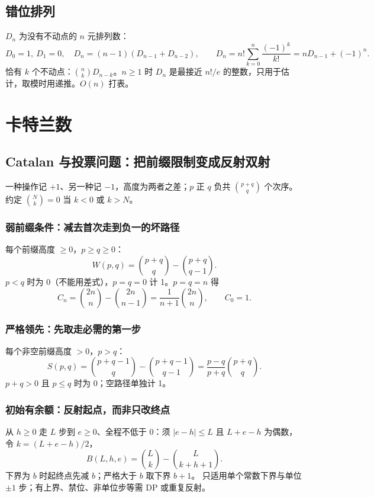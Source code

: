 \subsection{错位排列}\label{knowledge-derangement}
$D_n$ 为没有不动点的 $n$ 元排列数：
\[
D_0=1,\ D_1=0,\quad D_n=(n-1)(D_{n-1}+D_{n-2}),\qquad D_n=n!\sum_{k=0}^{n}\frac{(-1)^k}{k!}=nD_{n-1}+(-1)^n.
\]
恰有 $k$ 个不动点：$\binom nk D_{n-k}$。$n\ge1$ 时 $D_n$ 是最接近 $n!/e$ 的整数，只用于估计，取模时用递推。$O(n)$ 打表。



\Needspace{180pt}

\section{卡特兰数}

\subsection{Catalan 与投票问题：把前缀限制变成反射双射}\label{knowledge-ballot-reflection}
一种操作记 $+1$、另一种记 $-1$，高度为两者之差；$p$ 正 $q$ 负共 $\binom{p+q}{q}$ 个次序。
约定 $\binom Nk=0$ 当 $k<0$ 或 $k>N$。

\subsubsection{弱前缀条件：减去首次走到负一的坏路径}
每个前缀高度 $\ge0$，$p\ge q\ge0$：
\[
W(p,q)=\binom{p+q}{q}-\binom{p+q}{q-1}.
\]
$p<q$ 时为 0（不能用差式），$p=q=0$ 计 1。$p=q=n$ 得
\[
C_n=\binom{2n}{n}-\binom{2n}{n-1}
   =\frac1{n+1}\binom{2n}{n},\qquad C_0=1.
\]

\subsubsection{严格领先：先取走必需的第一步}
每个非空前缀高度 $>0$，$p>q$：
\[
S(p,q)=\binom{p+q-1}{q}-\binom{p+q-1}{q-1}
      =\frac{p-q}{p+q}\binom{p+q}{q}.
\]
$p+q>0$ 且 $p\le q$ 时为 0；空路径单独计 1。

\subsubsection{初始有余额：反射起点，而非只改终点}
从 $h\ge0$ 走 $L$ 步到 $e\ge0$、全程不低于 0：须 $|e-h|\le L$ 且 $L+e-h$ 为偶数，令 $k=(L+e-h)/2$，
\[
B(L,h,e)=\binom Lk-\binom L{k+h+1}.
\]
下界为 $b$ 时起终点先减 $b$；严格大于 $b$ 取下界 $b+1$。
只适用单个常数下界与单位 $\pm1$ 步；有上界、禁位、非单位步等需 DP 或重复反射。

